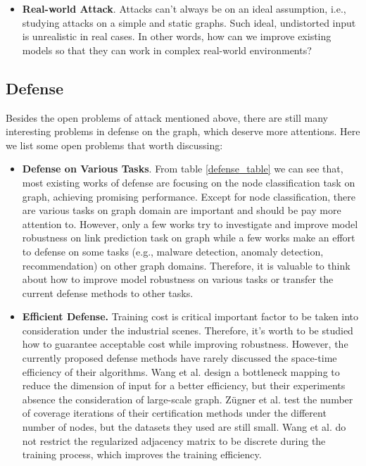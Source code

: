 \begin{itemize}
	\item \textbf{Real-world Attack}. Attacks can't always be on an ideal assumption, i.e., studying attacks on a simple and static graphs. Such ideal, undistorted input is unrealistic in real cases. In other words, how can we improve existing models so that they can work in complex real-world environments?
\end{itemize}

\subsection{Defense}
Besides the open problems of attack mentioned above, there are still many interesting problems in defense on the graph, which deserve more attentions. Here we list some open problems that worth discussing:
\begin{itemize}

	\item \textbf{Defense on Various Tasks}. From table \ref{defense_table} we can see that, most existing works of defense \cite{zugner2019certifiable,xu2019topology,jin2019power,wu2019adversarial,wang2019adversarial} are focusing on the node classification task on graph, achieving promising performance. Except for node classification, there are various tasks on graph domain are important and should be pay more attention to. However, only a few works \cite{pezeshkpour2019investigating,zhou2019adversarial} try to investigate and improve model robustness on link prediction task on graph while a few works \cite{hou2019alphacyber,ioannidis2019graphsac,he2018adversarial} make an effort to defense on some tasks (e.g., malware detection, anomaly detection, recommendation) on other graph domains. Therefore, it is valuable to think about how to improve model robustness on various tasks or transfer the current defense methods to other tasks.

	\item \textbf{Efficient Defense.} Training cost is critical important factor to be taken into consideration under the industrial scenes. Therefore, it's worth to be studied how to guarantee acceptable cost while improving robustness. However, the currently proposed defense methods have rarely discussed the space-time efficiency of their algorithms. Wang et al. \cite{wang2019adversarial} design a bottleneck mapping to reduce the dimension of input for a better efficiency, but their experiments absence the consideration of large-scale graph. Z\"ugner et al. \cite{zugner2019certifiable} test the number of coverage iterations of their certification methods under the different number of nodes, but the datasets they used are still small. Wang et al. \cite{wang2019graphdefense} do not restrict the regularized adjacency matrix to be discrete during the training process, which improves the training efficiency.


\end{itemize}
